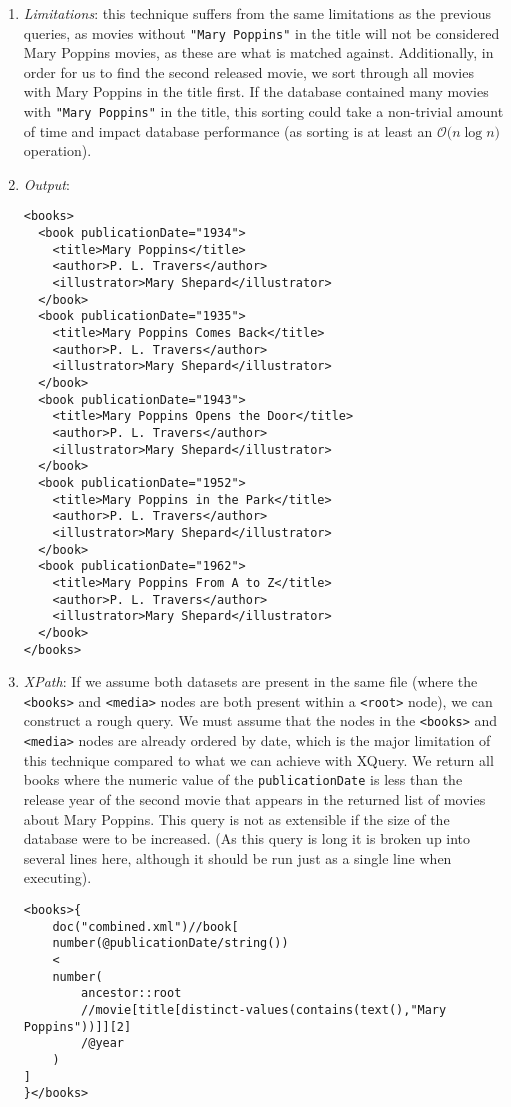 \documentclass[11pt]{article}
\begin{document}
\begin{enumerate}
\item \textit{Limitations}: this technique suffers from the same limitations as the previous queries, as movies without \texttt{"Mary Poppins"} in the title will not be considered Mary Poppins movies, as these are what is matched against. Additionally, in order for us to find the second released movie, we sort through all movies with Mary Poppins in the title first. If the database contained many movies with \texttt{"Mary Poppins"} in the title, this sorting could take a non-trivial amount of time and impact database performance (as sorting is at least an $\mathcal{O}({n\log{n})}$ operation).
\item \textit{Output}:
\begin{verbatim} 
<books>
  <book publicationDate="1934">
    <title>Mary Poppins</title>
    <author>P. L. Travers</author>
    <illustrator>Mary Shepard</illustrator>
  </book>
  <book publicationDate="1935">
    <title>Mary Poppins Comes Back</title>
    <author>P. L. Travers</author>
    <illustrator>Mary Shepard</illustrator>
  </book>
  <book publicationDate="1943">
    <title>Mary Poppins Opens the Door</title>
    <author>P. L. Travers</author>
    <illustrator>Mary Shepard</illustrator>
  </book>
  <book publicationDate="1952">
    <title>Mary Poppins in the Park</title>
    <author>P. L. Travers</author>
    <illustrator>Mary Shepard</illustrator>
  </book>
  <book publicationDate="1962">
    <title>Mary Poppins From A to Z</title>
    <author>P. L. Travers</author>
    <illustrator>Mary Shepard</illustrator>
  </book>
</books>
\end{verbatim} 

\item \textit{XPath}: If we assume both datasets are present in the same file (where the \texttt{<books>} and \texttt{<media>} nodes are both present within a \texttt{<root>} node), we can construct a rough query. We must assume that the nodes in the \texttt{<books>} and \texttt{<media>} nodes are already ordered by date, which is the major limitation of this technique compared to what we can achieve with XQuery. We return all books where the numeric value of the \texttt{publicationDate} is less than the release year of the second movie that appears in the returned list of movies about Mary Poppins. This query is not as extensible if the size of the database were to be increased. (As this query is long it is broken up into several lines here, although it should be run just as a single line when executing).

\begin{small}
\begin{verbatim}
<books>{
    doc("combined.xml")//book[
    number(@publicationDate/string())
    <
    number(
        ancestor::root
        //movie[title[distinct-values(contains(text(),"Mary Poppins"))]][2]
        /@year
    )
]
}</books>
\end{verbatim}
\end{small}
\end{enumerate}
\end{document}
